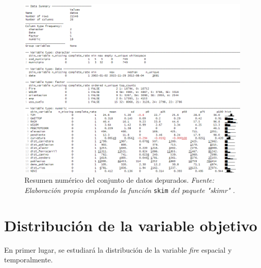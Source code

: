 \documentclass[12pt,a4paper,]{book}
\numberwithin{dummy}{section}
\theoremstyle{ocrenumbox}
\theoremstyle{blacknumex}
\theoremstyle{blacknumbox}
\theoremstyle{ocrenum}
\theoremstyle{ocrenum}
\begin{document}
\begin{figure}[htb]
\centering
\includegraphics[width = \textwidth]{graficos/skim_datos.png}
\caption[Resumen numérico del conjunto de datos depurados]{Resumen numérico del conjunto de datos depurados. \textit{ Fuente: Elaboración propia empleando la función} \texttt{skim} \it del paquete "skimr" \citep{skimrpackage}.}
\label{fig:skim_datos}
\end{figure}

\hypertarget{distribuciuxf3n-de-la-variable-objetivo}{%
\section{Distribución de la variable
objetivo}\label{distribuciuxf3n-de-la-variable-objetivo}}

En primer lugar, se estudiará la distribución de la variable \emph{fire}
espacial y temporalmente.
\end{document}
